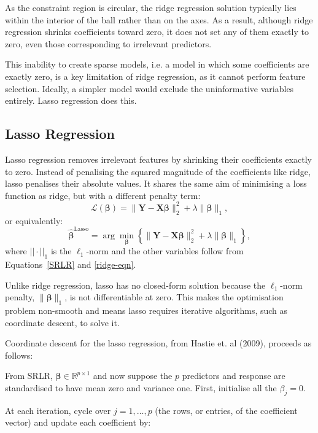 \documentclass[11pt]{report} %
\begin{document}
As the constraint region is circular, the ridge regression solution typically lies within the interior of the ball rather than on the axes. As a result, although ridge regression shrinks coefficients toward zero, it does not set any of them exactly to zero, even those corresponding to irrelevant predictors. 

This inability to create sparse models, i.e. a model in which some coefficients are exactly zero, is a key limitation of ridge regression, as it cannot perform feature selection. Ideally, a simpler model would exclude the uninformative variables entirely. Lasso regression does this.

\subsection{Lasso Regression}
\label{Lasso}
Lasso regression removes irrelevant features by shrinking their coefficients exactly to zero. Instead of penalising the squared magnitude of the coefficients like ridge, lasso penalises their absolute values. It shares the same aim of minimising a loss function as ridge, but with a different penalty term:
\begin{equation}
\mathcal{L}(\boldsymbol{\beta}) = \| \mathbf{Y} - \mathbf{X} \boldsymbol{\beta} \|_2^2 + \lambda \| \boldsymbol{\beta} \|_1,
\label{lasso-cost}
\end{equation}
\noindent or equivalently:
\[
\hat{\boldsymbol{\beta}}^{\text{Lasso}} = \arg\min_{\boldsymbol{\beta}} \left\{ \|\mathbf{Y} - \mathbf{X}\boldsymbol{\beta}\|_2^2 + \lambda \|\boldsymbol{\beta}\|_1 \right\},
\]
where $||\cdot||_1$ is the $\ell_1$-norm and the other variables follow from Equations~\ref{SRLR} and \ref{ridge-eqn}.

Unlike ridge regression, lasso has no closed-form solution because the \( \ell_1 \)-norm penalty, \( \| \boldsymbol{\beta} \|_1 \), is not differentiable at zero. This makes the optimisation problem non-smooth and means lasso requires iterative algorithms, such as coordinate descent, to solve it. 

\noindent Coordinate descent for the lasso regression, from Hastie et. al (2009),  proceeds as follows:

From SRLR, $\boldsymbol{\beta} \in \mathbb{R}^{p\times 1}$ and now suppose the \(p\) predictors and response are standardised to have mean zero and variance one. First, initialise all the \(\beta_j = 0\).

At each iteration, cycle over \(j = 1, \dots, p\) (the rows, or entries, of the coefficient vector) and update each coefficient by:
\end{document}
